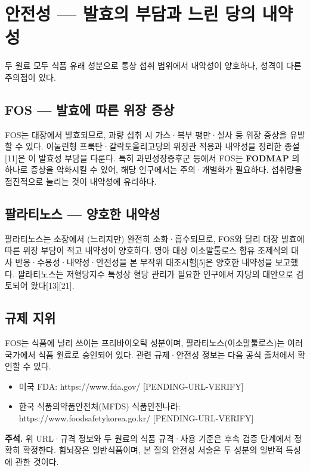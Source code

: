 \documentclass[11pt,oneside]{book}
\newenvironment{authnote}
  {\par\smallskip\begingroup\leftskip=7mm\rightskip=5mm\small\color{muted}\noindent\ignorespaces}
  {\par\endgroup\smallskip}
\begin{document}
\section{안전성 — 발효의 부담과 느린 당의 내약성}
두 원료 모두 식품 유래 성분으로 통상 섭취 범위에서 내약성이 양호하나, 성격이 다른 주의점이 있다.

\subsection{FOS — 발효에 따른 위장 증상}
FOS는 대장에서 발효되므로, 과량 섭취 시 가스·복부 팽만·설사 등 위장 증상을 유발할 수 있다. 이눌린형 프룩탄·갈락토올리고당의 위장관 적용과 내약성을 정리한 종설[11]은 이 발효성 부담을 다룬다. 특히 과민성장증후군 등에서 FOS는 \textbf{FODMAP} 의 하나로 증상을 악화시킬 수 있어, 해당 인구에서는 주의·개별화가 필요하다. 섭취량을 점진적으로 늘리는 것이 내약성에 유리하다.

\subsection{팔라티노스 — 양호한 내약성}
팔라티노스는 소장에서 (느리지만) 완전히 소화·흡수되므로, FOS와 달리 대장 발효에 따른 위장 부담이 적고 내약성이 양호하다. 영아 대상 이소말툴로스 함유 조제식의 대사 반응·수용성·내약성·안전성을 본 무작위 대조시험[5]은 양호한 내약성을 보고했다. 팔라티노스는 저혈당지수 특성상 혈당 관리가 필요한 인구에서 자당의 대안으로 검토되어 왔다[13][21].

\subsection{규제 지위}
FOS는 식품에 널리 쓰이는 프리바이오틱 성분이며, 팔라티노스(이소말툴로스)는 여러 국가에서 식품 원료로 승인되어 있다. 관련 규제·안전성 정보는 다음 공식 출처에서 확인할 수 있다.

\begin{itemize}[leftmargin=6mm,itemsep=1pt,topsep=2pt]
  \item 미국 FDA: https://www.fda.gov/ [PENDING-URL-VERIFY]
  \item 한국 식품의약품안전처(MFDS) 식품안전나라: https://www.foodsafetykorea.go.kr/ [PENDING-URL-VERIFY]
\end{itemize}
\begin{authnote}\textbf{주석.} 위 URL·규격 정보와 두 원료의 식품 규격·사용 기준은 후속 검증 단계에서 정확히 확정한다. 힘뇌장은 일반식품이며, 본 절의 안전성 서술은 두 성분의 일반적 특성에 관한 것이다.\end{authnote}
\end{document}
